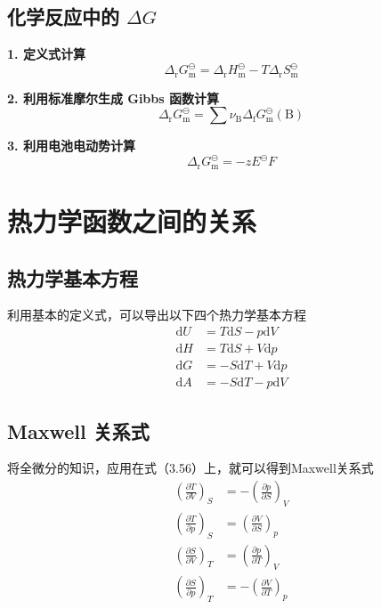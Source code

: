 \documentclass[lang=cn,newtx,11pt,scheme=chinese]{elegantbook}
\begin{document}
\subsection{化学反应中的 $\Delta G$}
\textbf{1. 定义式计算}
\begin{equation}
	\Delta_\mathrm{r}G^\ominus_\mathrm{m} = \Delta_\mathrm{r}H^\ominus_\mathrm{m}-T\Delta_\mathrm{r}S^\ominus_\mathrm{m}
\end{equation}

\textbf{2. 利用标准摩尔生成 Gibbs 函数计算}
\begin{equation}
	\Delta_\mathrm{r}G^\ominus _\mathrm{m}=\sum \nu _\mathrm{B}\Delta _\mathrm{f}G^\ominus _\mathrm{m}(\mathrm{B} )     
\end{equation}

\textbf{3. 利用电池电动势计算}
\begin{equation}
	\Delta_\mathrm{r}G^\ominus _\mathrm{m}=-zE^\ominus F
\end{equation}

\section{热力学函数之间的关系}
\subsection{热力学基本方程}
利用基本的定义式，可以导出以下四个热力学基本方程
\begin{equation}
	\begin{aligned}
		\mathrm{d}U &= T\mathrm{d}S-p\mathrm{d}V \\[1.5ex]
		\mathrm{d}H &= T\mathrm{d}S+V\mathrm{d}p \\[1.5ex]
		\mathrm{d}G &= -S\mathrm{d}T+V\mathrm{d}p \\[1.5ex]
		\mathrm{d}A &= -S\mathrm{d}T-p\mathrm{d}V
	\end{aligned}	
\end{equation}

\subsection{Maxwell 关系式}
将全微分的知识，应用在式（3.56）上，就可以得到Maxwell关系式
\begin{equation}
	\begin{aligned}
		\left ( \frac{\partial T}{\partial V}  \right )_S &= -\left ( \frac{\partial p}{\partial S}  \right )_V \\[1.5ex]
		\left ( \frac{\partial T}{\partial p}  \right )_S &= \left ( \frac{\partial V}{\partial S}  \right )_p \\[1.5ex]
		\left ( \frac{\partial S}{\partial V}  \right )_T &= \left ( \frac{\partial p}{\partial T}  \right )_V \\[1.5ex]
		\left ( \frac{\partial S}{\partial p}  \right )_T &= -\left ( \frac{\partial V}{\partial T}  \right )_p 
	\end{aligned}
\end{equation}
\end{document}
